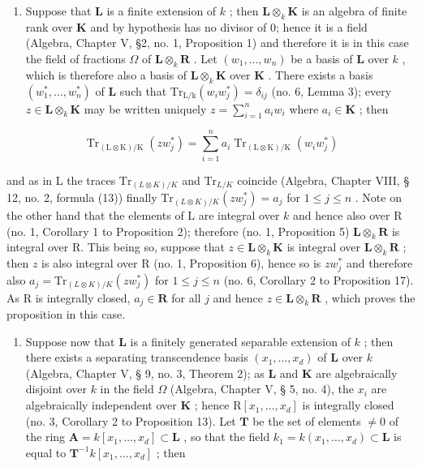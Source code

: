 \begin{enumerate}
\def\labelenumi{(\arabic{enumi})}
\tightlist
\item
  Suppose that \(\mathbf{L}\) is a finite extension of \(k\) ; then \(\mathbf{L} \otimes_k \mathbf{K}\) is an algebra of finite rank over \(\mathbf{K}\) and by hypothesis has no divisor of 0; hence it is a field (Algebra, Chapter V, §2, no. 1, Proposition 1) and therefore it is in this case the field of fractions \(\Omega\) of \(\mathbf{L} \otimes_k \mathbf{R}\) . Let \((w_1, \ldots, w_n)\) be a basis of \(\mathbf{L}\) over \(k\) , which is therefore also a basis of \(\mathbf{L} \otimes_k \mathbf{K}\) over \(\mathbf{K}\) . There exists a basis \((w_1^*, \ldots, w_n^*)\) of \(\mathbf{L}\) such that \(\mathrm{Tr}_{\mathrm{L/k}}(w_i w_j^*) = \delta_{ij}\) (no. 6, Lemma 3); every \(z \in \mathbf{L} \otimes_k \mathbf{K}\) may be written uniquely \(z = \sum_{i=1}^{n} a_i w_i\) where \(a_i \in \mathbf{K}\) ; then
\end{enumerate}

\[
\operatorname{Tr} _ {(\mathrm{L} \otimes \mathrm{K}) / \mathrm{K}} (z w _ {j} ^ {*}) = \sum_ {i = 1} ^ {n} a _ {i} \operatorname{Tr} _ {(\mathrm{L} \otimes \mathrm{K}) / \mathrm{K}} (w _ {i} w _ {j} ^ {*})
\]

and as in L the traces \(\mathrm{Tr}_{(L\otimes K)/K}\) and \(\mathrm{Tr}_{L/K}\) coincide (Algebra, Chapter VIII, § 12, no. 2, formula (13)) finally \(\mathrm{Tr}_{(L\otimes K)/K}(zw_j^*) = a_j\) for \(1 \leqslant j \leqslant n\) . Note on the other hand that the elements of L are integral over \(k\) and hence also over R (no. 1, Corollary 1 to Proposition 2); therefore (no. 1, Proposition 5) \(\mathbf{L} \otimes_k \mathbf{R}\) is integral over R. This being so, suppose that \(z \in \mathbf{L} \otimes_k \mathbf{K}\) is integral over \(\mathbf{L} \otimes_k \mathbf{R}\) ; then \(z\) is also integral over R (no. 1, Proposition 6), hence so is \(zw_j^*\) and therefore also \(a_j = \mathrm{Tr}_{(L\otimes K)/K}(zw_j^*)\) for \(1 \leqslant j \leqslant n\) (no. 6, Corollary 2 to Proposition 17). As R is integrally closed, \(a_j \in \mathbf{R}\) for all \(j\) and hence \(z \in \mathbf{L} \otimes_k \mathbf{R}\) , which proves the proposition in this case.

\begin{enumerate}
\def\labelenumi{(\arabic{enumi})}
\setcounter{enumi}{1}
\tightlist
\item
  Suppose now that \(\mathbf{L}\) is a finitely generated separable extension of \(k\) ; then there exists a separating transcendence basis \((x_1, \ldots, x_d)\) of \(\mathbf{L}\) over \(k\) (Algebra, Chapter V, § 9, no. 3, Theorem 2); as \(\mathbf{L}\) and \(\mathbf{K}\) are algebraically disjoint over \(k\) in the field \(\Omega\) (Algebra, Chapter V, § 5, no. 4), the \(x_i\) are algebraically independent over \(\mathbf{K}\) ; hence \(\mathrm{R}[x_1, \ldots, x_d]\) is integrally closed (no. 3, Corollary 2 to Proposition 13). Let \(\mathbf{T}\) be the set of elements \(\neq 0\) of the ring \(\mathbf{A} = k[x_1, \ldots, x_d] \subset \mathbf{L}\) , so that the field \(k_1 = k(x_1, \ldots, x_d) \subset \mathbf{L}\) is equal to \(\mathbf{T}^{-1} k[x_1, \ldots, x_d]\) ; then
\end{enumerate}

